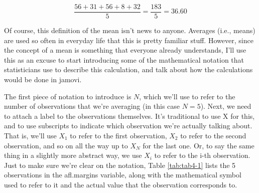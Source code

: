 \documentclass[
]{book}
\begin{document}
\[
\frac{56 + 31 + 56 + 8 + 32}{5} = \frac{183}{5} = 36.60
\]

Of course, this definition of the mean isn't news to anyone. Averages (i.e., means) are used so often in everyday life that this is pretty familiar stuff. However, since the concept of a mean is something that everyone already understands, I'll use this as an excuse to start introducing some of the mathematical notation that statisticians use to describe this calculation, and talk about how the calculations would be done in jamovi.

The first piece of notation to introduce is \(N\), which we'll use to refer to the number of observations that we're averaging (in this case \(N = 5\)). Next, we need to attach a label to the observations themselves. It's traditional to use X for this, and to use subscripts to indicate which observation we're actually talking about. That is, we'll use \(X_1\) to refer to the first observation, \(X_2\) to refer to the second observation, and so on all the way up to \(X_N\) for the last one. Or, to say the same thing in a slightly more abstract way, we use \(X_i\) to refer to the i-th observation. Just to make sure we're clear on the notation, Table \ref{tab:tab4-1} lists the 5 observations in the afl.margins variable, along with the mathematical symbol used to refer to it and the actual value that the observation corresponds to.

 
  \providecommand{\huxb}[2]{\arrayrulecolor[RGB]{#1}\global\arrayrulewidth=#2pt}
  \providecommand{\huxvb}[2]{\color[RGB]{#1}\vrule width #2pt}
  \providecommand{\huxtpad}[1]{\rule{0pt}{#1}}
  \providecommand{\huxbpad}[1]{\rule[-#1]{0pt}{#1}}
\end{document}
